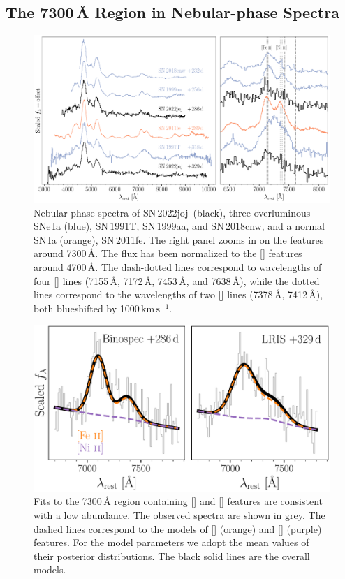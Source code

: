 \documentclass[twocolumn]{aastex631}
\newcommand{\sn}{SN\,2022joj}
\newcommand{\kms}{$\mathrm{km}\,\mathrm{s}^{-1}$}
\begin{document}
\begin{CJK*}{UTF8}{gbsn}
\subsection{The 7300\,\r{A} Region in Nebular-phase Spectra}
\label{sec:disc_nebular}
\begin{figure}
    \centering
    \includegraphics[width=\linewidth]{spec_comp_nebular.pdf}
    \caption{Nebular-phase spectra of \sn\ (black), three overluminous SNe\,Ia (blue), SN\,1991T, SN\,1999aa, and SN\,2018cnw, and a normal SN\,Ia (orange), SN\,2011fe. The right panel zooms in on the features around 7300\,\r{A}. The flux has been normalized to the [] features around 4700\,\r{A}. The dash-dotted lines correspond to wavelengths of four [] lines (7155\,\r{A}, 7172\,\r{A}, 7453\,\r{A}, and 7638\,\r{A}), while the dotted lines correspond to the wavelengths of two [] lines (7378\,\r{A}, 7412\,\r{A}), both blueshifted by 1000\,\kms.}
    \label{fig:nebular_spec}
\end{figure}
\begin{figure}
    \centering
    \includegraphics[width=\linewidth]{Fe_Ni.pdf}
    \caption{Fits to the 7300\,\r{A} region containing [] and [] features are consistent with a low  abundance. The observed spectra are shown in grey. The dashed lines correspond to the models of [] (orange) and [] (purple) features. For the model parameters we adopt the mean values of their posterior distributions. The black solid lines are the overall models.}
    \label{fig:Fe_ni}
\end{figure}


\end{CJK*}
\end{document}
